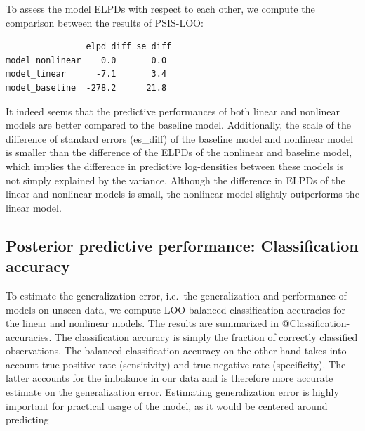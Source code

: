 \documentclass[
  letterpaper,
  DIV=11,
  numbers=noendperiod]{scrartcl}
\begin{document}
To assess the model ELPDs with respect to each other, we compute the
comparison between the results of PSIS-LOO:

\begin{verbatim}
                elpd_diff se_diff
model_nonlinear    0.0       0.0 
model_linear      -7.1       3.4 
model_baseline  -278.2      21.8 
\end{verbatim}

It indeed seems that the predictive performances of both linear and
nonlinear models are better compared to the baseline model.
Additionally, the scale of the difference of standard errors (es\_diff)
of the baseline model and nonlinear model is smaller than the difference
of the ELPDs of the nonlinear and baseline model, which implies the
difference in predictive log-densities between these models is not
simply explained by the variance. Although the difference in ELPDs of
the linear and nonlinear models is small, the nonlinear model slightly
outperforms the linear model.

\hypertarget{posterior-predictive-performance-classification-accuracy}{%
\subsection{Posterior predictive performance: Classification
accuracy}\label{posterior-predictive-performance-classification-accuracy}}

To estimate the generalization error, i.e.~the generalization and
performance of models on unseen data, we compute LOO-balanced
classification accuracies for the linear and nonlinear models. The
results are summarized in @Classification-accuracies. The classification
accuracy is simply the fraction of correctly classified observations.
The balanced classification accuracy on the other hand takes into
account true positive rate (sensitivity) and true negative rate
(specificity). The latter accounts for the imbalance in our data and is
therefore more accurate estimate on the generalization error. Estimating
generalization error is highly important for practical usage of the
model, as it would be centered around predicting
\end{document}
